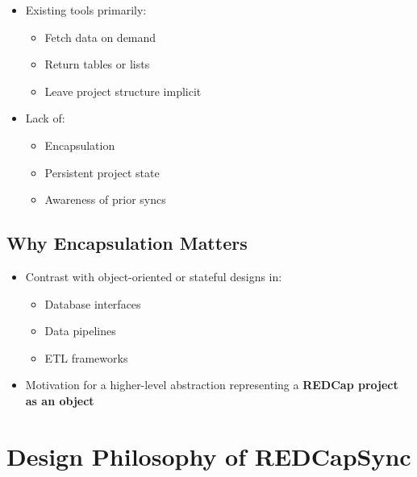 \begin{itemize}
\tightlist
\item
  Existing tools primarily:

  \begin{itemize}
  \tightlist
  \item
    Fetch data on demand
  \item
    Return tables or lists
  \item
    Leave project structure implicit
  \end{itemize}
\item
  Lack of:

  \begin{itemize}
  \tightlist
  \item
    Encapsulation\\
  \item
    Persistent project state\\
  \item
    Awareness of prior syncs
  \end{itemize}
\end{itemize}

\subsection{Why Encapsulation Matters}\label{why-encapsulation-matters}

\begin{itemize}
\tightlist
\item
  Contrast with object-oriented or stateful designs in:

  \begin{itemize}
  \tightlist
  \item
    Database interfaces\\
  \item
    Data pipelines\\
  \item
    ETL frameworks\\
  \end{itemize}
\item
  Motivation for a higher-level abstraction representing a \textbf{REDCap project as an object}
\end{itemize}

\section{Design Philosophy of REDCapSync}\label{design-philosophy-of-redcapsync}

